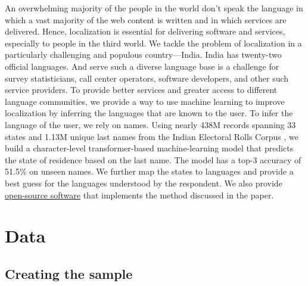 \documentclass[11pt,  letterpaper]{article}
\begin{document}
An overwhelming majority of the people in the world don’t speak the language in which a vast majority of the web content is written and in which services are delivered. Hence, localization is essential for delivering software and services, especially to people in the third world. We tackle the problem of localization in a particularly challenging and populous country—India. India has twenty-two official languages. And serve such a diverse language base is a challenge for survey statisticians, call center operators, software developers, and other such service providers. To provide better services and greater access to different language communities, we provide a way to use machine learning to improve localization by inferring the languages that are known to the user. To infer the language of the user, we rely on names. Using nearly 438M records spanning 33 states and 1.13M unique last names from the Indian Electoral Rolls Corpus \citep{DVN/OG47IV_2023}, we build a character-level transformer-based machine-learning model that predicts the state of residence based on the last name. The model has a top-3 accuracy of 51.5\%  on unseen names. We further map the states to languages and provide a best guess for the languages understood by the respondent. We also provide \href{https://github.com/in-rolls/instate}{open-source software} that implements the method discussed in the paper. 


\section{Data}

\subsection{Creating the sample}
\end{document}
